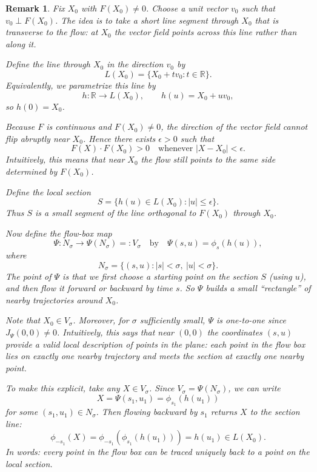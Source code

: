 \documentclass{tufte-handout}
\newcommand*\R{\mathbb{R}}
\newtheorem{rmk}[thm]{Remark}
\theoremstyle{definition}
\begin{document}
\begin{rmk}
	Fix $X_0$ with $F(X_0)\ne 0$. Choose a unit vector $v_0$ such that $v_0 \perp F(X_0)$.
	The idea is to take a short line segment through $X_0$ that is transverse to the flow:
	at $X_0$ the vector field points across this line rather than along it.

	Define the line through $X_0$ in the direction $v_0$ by
	\[
		L(X_0) = \{ X_0 + t v_0 : t\in \R \}
	.\]
	Equivalently, we parametrize this line by
	\[
		h:\R \to L(X_0),
		\qquad
		h(u)=X_0+u v_0,
	\]
	so $h(0)=X_0$.

	Because $F$ is continuous and $F(X_0)\ne 0$, the direction of the vector field cannot
	flip abruptly near $X_0$. Hence there exists $\epsilon>0$ such that
	\[
		F(X)\cdot F(X_0)>0
		\quad \text{whenever } |X-X_0|<\epsilon
	.\]
	Intuitively, this means that near $X_0$ the flow still points to the same side
	determined by $F(X_0)$.

	Define the local section
	\[
		S = \{ h(u) \in L(X_0) : |u|\le \epsilon \}
	.\]
	Thus $S$ is a small segment of the line orthogonal to $F(X_0)$ through $X_0$.

	Now define the flow-box map
	\[
		\Psi: N_\sigma \to \Psi(N_\sigma)=:V_\sigma
		\quad \text{by} \quad
		\Psi(s,u)=\phi_s(h(u)),
	\]
	where
	\[
		N_\sigma=\{(s,u): |s|<\sigma,\ |u|<\sigma\}.
	\]
	The point of $\Psi$ is that we first choose a starting point on the section $S$
	(using $u$), and then flow it forward or backward by time $s$.
	So $\Psi$ builds a small ``rectangle'' of nearby trajectories around $X_0$.

	Note that $X_0\in V_\sigma$. Moreover, for $\sigma$ sufficiently small,
	$\Psi$ is one-to-one since $J_{\Psi}(0,0)\ne 0$.
	Intuitively, this says that near $(0,0)$ the coordinates $(s,u)$ provide
	a valid local description of points in the plane: each point in the flow box
	lies on exactly one nearby trajectory and meets the section at exactly one nearby point.

	To make this explicit, take any $X\in V_\sigma$.
	Since $V_\sigma=\Psi(N_\sigma)$, we can write
	\[
		X=\Psi(s_1,u_1)=\phi_{s_1}(h(u_1))
	\]
	for some $(s_1,u_1)\in N_\sigma$.
	Then flowing backward by $s_1$ returns $X$ to the section line:
	\[
		\phi_{-s_1}(X)
		= \phi_{-s_1}\!\left(\phi_{s_1}(h(u_1))\right)
		= h(u_1)\in L(X_0)
	.\]
	In words: every point in the flow box can be traced uniquely back to a point
	on the local section.
\end{rmk}
\end{document}
